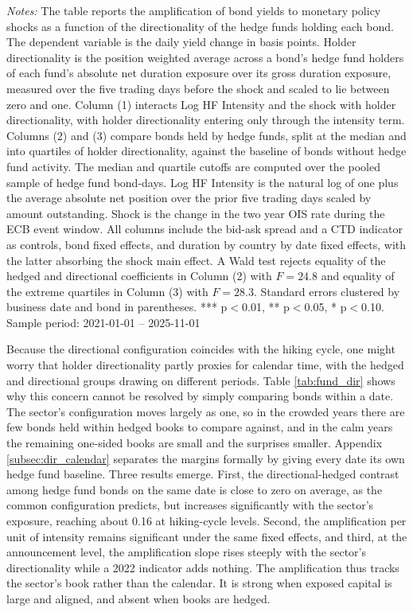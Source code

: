 \documentclass[english, 11pt, oneside]{article}
\begin{document}
\begin{table}[t]
\vspace{1ex}
\raggedright\scriptsize
\textit{Notes:} The table reports the amplification of bond yields to monetary policy shocks as a function of the directionality of the hedge funds holding each bond. The dependent variable is the daily yield change in basis points. Holder directionality is the position weighted average across a bond's hedge fund holders of each fund's absolute net duration exposure over its gross duration exposure, measured over the five trading days before the shock and scaled to lie between zero and one. Column (1) interacts Log HF Intensity and the shock with holder directionality, with holder directionality entering only through the intensity term. Columns (2) and (3) compare bonds held by hedge funds, split at the median and into quartiles of holder directionality, against the baseline of bonds without hedge fund activity. The median and quartile cutoffs are computed over the pooled sample of hedge fund bond-days. Log HF Intensity is the natural log of one plus the average absolute net position over the prior five trading days scaled by amount outstanding. Shock is the change in the two year OIS rate during the ECB event window. All columns include the bid-ask spread and a CTD indicator as controls, bond fixed effects, and duration by country by date fixed effects, with the latter absorbing the shock main effect. A Wald test rejects equality of the hedged and directional coefficients in Column (2) with $F=24.8$ and equality of the extreme quartiles in Column (3) with $F=28.3$. Standard errors clustered by business date and bond in parentheses. *** p$<$0.01, ** p$<$0.05, * p$<$0.10. \\ Sample period: 2021-01-01 -- 2025-11-01
\end{table}

Because the directional configuration coincides with the hiking cycle, one might worry that holder directionality partly proxies for calendar time, with the hedged and directional groups drawing on different periods. Table \ref{tab:fund_dir} shows why this concern cannot be resolved by simply comparing bonds within a date. The sector's configuration moves largely as one, so in the crowded years there are few bonds held within hedged books to compare against, and in the calm years the remaining one-sided books are small and the surprises smaller. Appendix \ref{subsec:dir_calendar} separates the margins formally by giving every date its own hedge fund baseline. Three results emerge. First, the directional-hedged contrast among hedge fund bonds on the same date is close to zero on average, as the common configuration predicts, but increases significantly with the sector's exposure, reaching about 0.16 at hiking-cycle levels. Second, the amplification per unit of intensity remains significant under the same fixed effects, and third, at the announcement level, the amplification slope rises steeply with the sector's directionality while a 2022 indicator adds nothing. The amplification thus tracks the sector's book rather than the calendar. It is strong when exposed capital is large and aligned, and absent when books are hedged.
\end{document}
